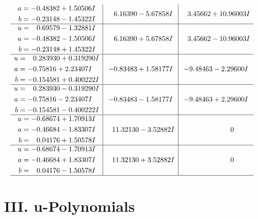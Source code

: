 \documentclass[1p]{elsarticle_modified}
\theoremstyle{definition}
\begin{document}
$$\begin{array}{c|c|c}
\begin{aligned}
a &= -0.48382 + 1.50506 I \\
b &= -0.23148 - 1.45322 I\end{aligned}
 & \phantom{-}6.16390 - 5.67858 I & \phantom{-}3.45662 + 10.96003 I \\ \hline\begin{aligned}
u &= \phantom{-}0.69579 - 1.32881 I \\
a &= -0.48382 - 1.50506 I \\
b &= -0.23148 + 1.45322 I\end{aligned}
 & \phantom{-}6.16390 + 5.67858 I & \phantom{-}3.45662 - 10.96003 I \\ \hline\begin{aligned}
u &= \phantom{-}0.283930 + 0.319290 I \\
a &= -0.75816 + 2.23407 I \\
b &= -0.154581 + 0.400222 I\end{aligned}
 & -0.83483 + 1.58177 I & -9.48463 - 2.29600 I \\ \hline\begin{aligned}
u &= \phantom{-}0.283930 - 0.319290 I \\
a &= -0.75816 - 2.23407 I \\
b &= -0.154581 - 0.400222 I\end{aligned}
 & -0.83483 - 1.58177 I & -9.48463 + 2.29600 I \\ \hline\begin{aligned}
u &= -0.68674 + 1.70913 I \\
a &= -0.46684 - 1.83307 I \\
b &= \phantom{-}0.04176 + 1.50578 I\end{aligned}
 & \phantom{-}11.32130 - 3.52882 I & \phantom{-0.000000 } 0 \\ \hline\begin{aligned}
u &= -0.68674 - 1.70913 I \\
a &= -0.46684 + 1.83307 I \\
b &= \phantom{-}0.04176 - 1.50578 I\end{aligned}
 & \phantom{-}11.32130 + 3.52882 I & \phantom{-0.000000 } 0\\
 \hline 
 \end{array}$$\newpage
\newpage\renewcommand{\arraystretch}{1}
\centering \section*{ III. u-Polynomials}
\end{document}
